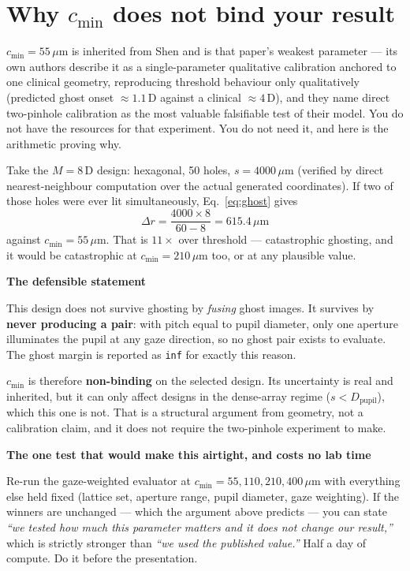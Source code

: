 \documentclass[11pt]{report}
\newenvironment{keybox}[1]%
{\par\vspace{8pt}\begin{lrbox}{\kbsave}\begin{minipage}{0.88\textwidth}%
{\bfseries\color{hbblue}#1}\par\vspace{4pt}\ignorespaces}%
{\end{minipage}\end{lrbox}%
\begin{center}\setlength{\fboxrule}{1.2pt}\setlength{\fboxsep}{8pt}%
\fcolorbox{hbblue}{boxgrey}{\usebox{\kbsave}}\end{center}\vspace{8pt}\par}
\newenvironment{warnbox}[1]%
{\par\vspace{8pt}\begin{lrbox}{\wbsave}\begin{minipage}{0.88\textwidth}%
{\bfseries\color{warnred}#1}\par\vspace{4pt}\ignorespaces}%
{\end{minipage}\end{lrbox}%
\begin{center}\setlength{\fboxrule}{1.2pt}\setlength{\fboxsep}{8pt}%
\fcolorbox{warnred}{white}{\usebox{\wbsave}}\end{center}\vspace{8pt}\par}
\newcommand{\Dpupil}{D_{\text{pupil}}}
\begin{document}
\section{Why \texorpdfstring{$c_{\min}$}{c\_min} does not bind your result}

$c_{\min} = 55\,\mu$m is inherited from Shen and is that paper's weakest parameter --- its own
authors describe it as a single-parameter qualitative calibration anchored to one clinical
geometry, reproducing threshold behaviour only qualitatively (predicted ghost onset $\approx1.1$\,D
against a clinical $\approx4$\,D), and they name direct two-pinhole calibration as the most
valuable falsifiable test of their model. You do not have the resources for that experiment.
You do not need it, and here is the arithmetic proving why.

Take the $M=8$\,D design: hexagonal, 50 holes, $s = 4000\,\mu$m (verified by direct
nearest-neighbour computation over the actual generated coordinates). If two of those holes were
ever lit simultaneously, Eq.~\ref{eq:ghost} gives
\begin{equation}
\Delta r = \frac{4000 \times 8}{60-8} = 615.4\,\mu\text{m}
\end{equation}
against $c_{\min} = 55\,\mu$m. That is $11\times$ over threshold --- catastrophic ghosting, and it
would be catastrophic at $c_{\min} = 210\,\mu$m too, or at any plausible value.

\begin{keybox}{The defensible statement}
This design does not survive ghosting by \emph{fusing} ghost images. It survives by \textbf{never
producing a pair}: with pitch equal to pupil diameter, only one aperture illuminates the pupil at
any gaze direction, so no ghost pair exists to evaluate. The ghost margin is reported as
\texttt{inf} for exactly this reason.

$c_{\min}$ is therefore \textbf{non-binding} on the selected design. Its uncertainty is real and
inherited, but it can only affect designs in the dense-array regime ($s < \Dpupil$), which this
one is not. That is a structural argument from geometry, not a calibration claim, and it does not
require the two-pinhole experiment to make.
\end{keybox}

\begin{warnbox}{The one test that would make this airtight, and costs no lab time}
Re-run the gaze-weighted evaluator at $c_{\min} = 55, 110, 210, 400\,\mu$m with everything else
held fixed (lattice set, aperture range, pupil diameter, gaze weighting). If the winners are
unchanged --- which the argument above predicts --- you can state \emph{``we tested how much this
parameter matters and it does not change our result,''} which is strictly stronger than
\emph{``we used the published value.''} Half a day of compute. Do it before the presentation.
\end{warnbox}
\end{document}
